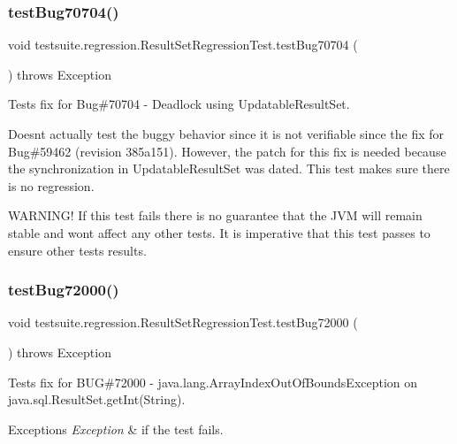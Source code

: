 \subsubsection{\texorpdfstring{test\+Bug70704()}{testBug70704()}}
{\footnotesize\ttfamily void testsuite.\+regression.\+Result\+Set\+Regression\+Test.\+test\+Bug70704 (\begin{DoxyParamCaption}{ }\end{DoxyParamCaption}) throws Exception}

Tests fix for Bug\#70704 -\/ Deadlock using Updatable\+Result\+Set.

Doesn\textquotesingle{}t actually test the buggy behavior since it is not verifiable since the fix for Bug\#59462 (revision 385a151). However, the patch for this fix is needed because the synchronization in Updatable\+Result\+Set was dated. This test makes sure there is no regression.

W\+A\+R\+N\+I\+N\+G! If this test fails there is no guarantee that the J\+VM will remain stable and won\textquotesingle{}t affect any other tests. It is imperative that this test passes to ensure other tests results. \mbox{\label{classtestsuite_1_1regression_1_1_result_set_regression_test_ac5cb7a4e2ccabb68566100d643272bb4}} 
\subsubsection{\texorpdfstring{test\+Bug72000()}{testBug72000()}}
{\footnotesize\ttfamily void testsuite.\+regression.\+Result\+Set\+Regression\+Test.\+test\+Bug72000 (\begin{DoxyParamCaption}{ }\end{DoxyParamCaption}) throws Exception}

Tests fix for B\+UG\#72000 -\/ java.\+lang.\+Array\+Index\+Out\+Of\+Bounds\+Exception on java.\+sql.\+Result\+Set.\+get\+Int(\+String).


\begin{DoxyExceptions}{Exceptions}
{\em Exception} & if the test fails. \\
\hline
\end{DoxyExceptions}
\mbox{\label{classtestsuite_1_1regression_1_1_result_set_regression_test_a86a107fd1b712bfc306b455d84d42572}} 
